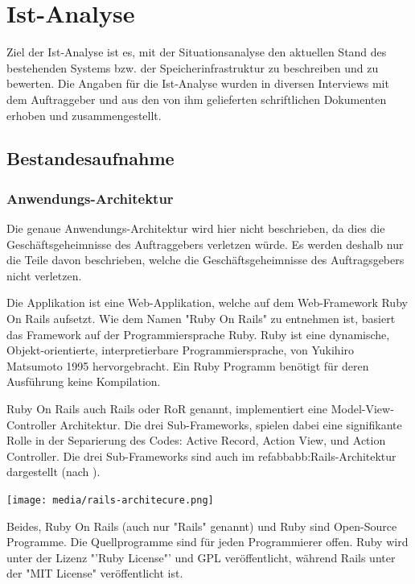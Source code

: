 
\cleardoublepage
\chapter{Ist-Analyse}
Ziel der Ist-Analyse ist es, mit der Situationsanalyse den aktuellen Stand des bestehenden Systems bzw. der Speicherinfrastruktur zu beschreiben und zu bewerten.
Die Angaben für die Ist-Analyse wurden in diversen Interviews mit dem Auftraggeber und aus den von ihm gelieferten schriftlichen Dokumenten erhoben und zusammengestellt.

\section{Bestandesaufnahme}
\subsection{Anwendungs-Architektur}
Die genaue Anwendungs-Architektur wird hier nicht beschrieben, da dies die Geschäftsgeheimnisse des Auftraggebers verletzen würde. Es werden deshalb nur die Teile davon beschrieben, welche die Geschäftsgeheimnisse des Auftragsgebers nicht verletzen.

Die Applikation ist eine Web-Applikation, welche auf dem Web-Framework Ruby On Rails aufsetzt.
Wie dem Namen "Ruby On Rails" zu entnehmen ist, basiert das Framework auf der Programmiersprache Ruby. Ruby ist eine dynamische, Objekt-orientierte, interpretierbare Programmiersprache, von Yukihiro Matsumoto 1995 hervorgebracht. Ein Ruby Programm benötigt für deren Ausführung keine Kompilation.

Ruby On Rails auch Rails oder RoR genannt, implementiert eine Model-View-Controller Architektur. Die drei Sub-Frameworks, spielen dabei eine signifikante Rolle in der Separierung des Codes: Active Record, Action View, und Action Controller. Die drei Sub-Frameworks sind auch im refabb{abb:Rails-Architektur} dargestellt (nach \cite{Bachle2007}).

\begin{center}
\texttt{[image: media/rails-architecure.png]}
\end{center}

Beides, Ruby On Rails (auch nur "Rails" genannt) und Ruby sind Open-Source Programme. Die Quellprogramme sind für jeden Programmierer offen. Ruby wird unter der Lizenz "'Ruby License"' und GPL veröffentlicht, während Rails unter der "MIT License" veröffentlicht ist.

